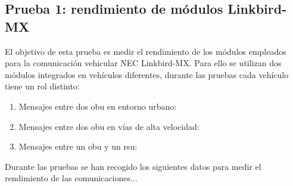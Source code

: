 \subsection{Prueba 1: rendimiento de módulos Linkbird-MX}
El objetivo de esta prueba es medir el rendimiento de los módulos empleados
para la comunicación vehicular NEC Linkbird-MX. Para ello se utilizan dos
módulos integrados en vehículos diferentes, durante las pruebas cada vehículo
tiene un rol distinto:

\begin{enumerate}
	\item Mensajes entre dos \gls{obu} en entorno urbano:
	
	\item Mensajes entre dos \gls{obu} en vías de alta velocidad:
	
	\item Mensajes entre un \gls{obu} y un \gls{rsu}:
\end{enumerate}

Durante las pruebas se han recogido los siguientes datos para medir el
rendimiento de las comunicaciones...